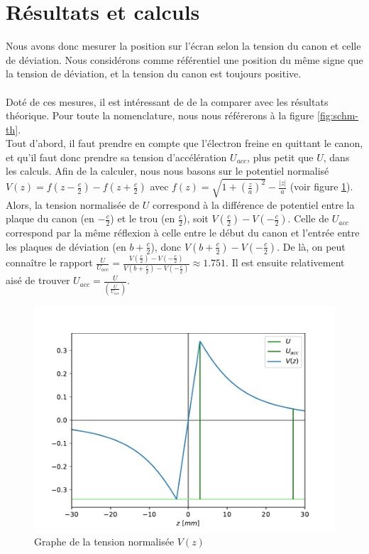 \documentclass[11pt]{article}
\begin{document}
\section{Résultats et calculs}

Nous avons donc mesurer la position sur l'écran selon la tension du canon et celle de déviation. Nous considérons comme référentiel une position du même signe que la tension de déviation, et la tension du canon est toujours positive.\\ \\
Doté de ces mesures, il est intéressant de de la comparer avec les résultats théorique. Pour toute la nomenclature, nous nous référerons à la figure \ref{fig:schm-th}.\\
Tout d'abord, il faut prendre en compte que l'électron freine en quittant le canon, et qu'il faut donc prendre sa tension d’accélération $U_{acc}$, plus petit que $U$, dans les calculs. Afin de la calculer, nous nous basons sur le potentiel normalisé $V(z)=f(z - \frac{c}{2})-f(z+\frac{c}{2})$  avec $f(z)=\sqrt{1+(\frac{z}{a})^2}-\frac{|z|}{a}$ (voir figure \ref{fig:u-norm}). Alors, la tension normalisée de $U$ correspond à la différence de potentiel entre la plaque du canon (en $-\frac{c}{2}$) et le trou (en $\frac{c}{2}$), soit $V(\frac{c}{2})-V(-\frac{c}{2})$. Celle de $U_{acc}$ correspond par la même réflexion à celle entre le début du canon et l'entrée entre les plaques de déviation (en $b+\frac{c}{2}$), donc $V(b+\frac{c}{2})-V(-\frac{c}{2})$. De là, on peut connaître le rapport $\frac{U}{U_{acc}}=\frac{V(\frac{c}{2})-V(-\frac{c}{2})}{V(b+\frac{c}{2})-V(-\frac{c}{2})} \approx 1.751$. Il est ensuite relativement aisé de trouver $U_{acc} = \frac{U}{(\frac{U}{U_{acc}})}$.

\begin{figure}[H]
\center
\includegraphics[scale=0.75]{Images/tens-norm.pdf}
\caption{Graphe de la tension normalisée $V(z)$}
\label{fig:u-norm}
\end{figure}
\end{document}
